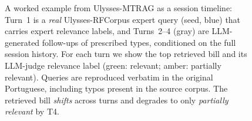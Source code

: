 \begin{figure}[t]
\begin{tikzpicture}
\end{tikzpicture}
\caption{A worked example from Ulysses-MTRAG as a session timeline: Turn~1 is a
\emph{real} Ulysses-RFCorpus expert query (seed, blue) that carries expert
relevance labels, and Turns~2--4 (gray) are LLM-generated follow-ups of
prescribed types, conditioned on the full session history. For each turn we show
the top retrieved bill and its LLM-judge relevance label (green: relevant;
amber: partially relevant). Queries are reproduced verbatim in the original
Portuguese, including typos present in the source corpus. The retrieved bill
\emph{shifts} across turns and degrades to only \emph{partially relevant} by T4.}
\label{fig:example}
\end{figure}
